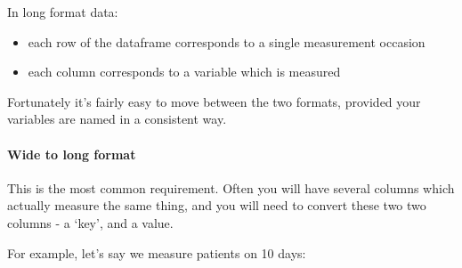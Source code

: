 \documentclass[]{article}
\newenvironment{Shaded}{\begin{snugshade}}{\end{snugshade}}
\newcommand{\DataTypeTok}[1]{\textcolor[rgb]{0.13,0.29,0.53}{#1}}
\newcommand{\DecValTok}[1]{\textcolor[rgb]{0.00,0.00,0.81}{#1}}
\newcommand{\KeywordTok}[1]{\textcolor[rgb]{0.13,0.29,0.53}{\textbf{#1}}}
\newcommand{\NormalTok}[1]{#1}
\newcommand{\OperatorTok}[1]{\textcolor[rgb]{0.81,0.36,0.00}{\textbf{#1}}}
\newcommand{\StringTok}[1]{\textcolor[rgb]{0.31,0.60,0.02}{#1}}
\providecommand{\tightlist}{%
  \setlength{\itemsep}{0pt}\setlength{\parskip}{0pt}}
\let\oldparagraph\paragraph
\renewcommand{\paragraph}[1]{\oldparagraph{#1}\mbox{}}
\begin{document}
In long format data:

\begin{itemize}
\tightlist
\item
  each row of the dataframe corresponds to a single measurement occasion
\item
  each column corresponds to a variable which is measured
\end{itemize}

Fortunately it's fairly easy to move between the two formats, provided your
variables are named in a consistent way.

\hypertarget{wide-to-long}{%
\paragraph{Wide to long format}\label{wide-to-long}}

This is the most common requirement. Often you will have several columns which
actually measure the same thing, and you will need to convert these two two
columns - a `key', and a value.

For example, let's say we measure patients on 10 days:

\begin{Shaded}
\end{Shaded}
\end{document}
